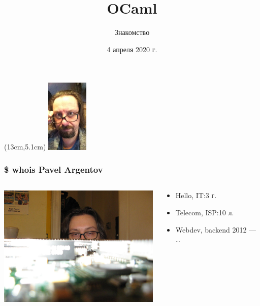 

\title{OCaml}
\subtitle{Знакомство}

\date{4 апреля 2020 г.}



\begin{frame}
  \titlepage{}

  \begin{textblock*}{4cm} (13cm,5.1cm)
  \includegraphics[height=3.5cm]{./images/ag.png}
  \end{textblock*}
\end{frame}

\begin{frame}
  \frametitle{\$ whois Pavel Argentov}
  \large
  \vspace{8mm}
  \begin{columns}
    \begin{column}{8cm}
      \includegraphics[width=8cm,keepaspectratio]{./images/ag_cisco.jpg}
    \end{column}

    \begin{column}{5cm}
      \begin{itemize}
        \item Hello, IT:\@ 3 г.
        \item Telecom, ISP:\@ 10 л.
        \item Webdev, backend 2012 --- \dots
      \end{itemize}
    \end{column}
  \end{columns}
\end{frame}

